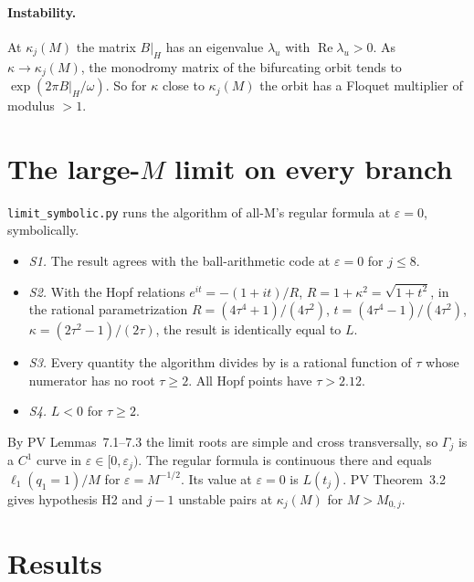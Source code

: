\documentclass[11pt,a4paper]{report}
\begin{document}
\paragraph{Instability.} At \(\kappa_j(M)\) the matrix \(B|_H\) has an eigenvalue \(\lambda_u\) with
\(\operatorname{Re}\lambda_u>0\). As \(\kappa\to\kappa_j(M)\), the monodromy matrix of the bifurcating orbit tends to
\(\exp(2\pi B|_H/\omega)\). So for \(\kappa\) close to \(\kappa_j(M)\) the orbit has a Floquet multiplier of modulus
\(>1\).

\section{The large-\texorpdfstring{\(M\)}{M} limit on every branch}

\texttt{limit\_symbolic.py} runs the algorithm of all-M's regular formula at \(\varepsilon=0\), symbolically.
\begin{itemize}
\item \emph{S1.} The result agrees with the ball-arithmetic code at \(\varepsilon=0\) for \(j\le8\).
\item \emph{S2.} With the Hopf relations \(e^{it}=-(1+it)/R\), \(R=1+\kappa^2=\sqrt{1+t^2}\), in the rational
parametrization \(R=(4\tau^4+1)/(4\tau^2)\), \(t=(4\tau^4-1)/(4\tau^2)\), \(\kappa=(2\tau^2-1)/(2\tau)\), the result is
identically equal to \(L\).
\item \emph{S3.} Every quantity the algorithm divides by is a rational function of \(\tau\) whose numerator has no root
\(\tau\ge2\). All Hopf points have \(\tau>2.12\).
\item \emph{S4.} \(L<0\) for \(\tau\ge2\).
\end{itemize}
By PV Lemmas~7.1--7.3 the limit roots are simple and cross transversally, so \(\Gamma_j\) is a \(C^1\) curve in
\(\varepsilon\in[0,\varepsilon_j)\). The regular formula is continuous there and equals \(\ell_1(q_1=1)/M\) for
\(\varepsilon=M^{-1/2}\). Its value at \(\varepsilon=0\) is \(L(t_j)\). PV Theorem~3.2 gives hypothesis H2 and \(j-1\)
unstable pairs at \(\kappa_j(M)\) for \(M>M_{0,j}\).

\section{Results}
\end{document}
